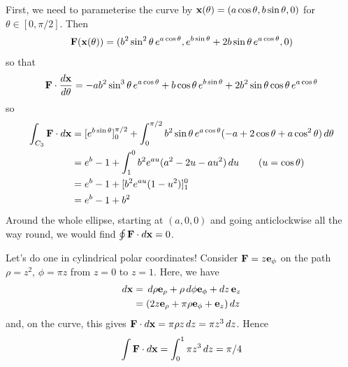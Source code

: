 \documentclass{../../template/note}
\begin{document}
\begin{example*}
\begin{itemize}
            First, we need to parameterise the curve by \(\V x(\theta) = (a \cos \theta, b \sin \theta, 0)\) for \(\theta \in [0, \pi/2]\). Then
            \begin{align*}
                \V F(\V x(\theta)) = (b^2 \sin^2 \theta \, e^{a \cos \theta}, e^{b \sin \theta} + 2b \sin \theta \, e^{a \cos \theta}, 0)
            \end{align*}
            so that
            \begin{align*}
                \V F \cdot \frac{d \V x}{d \theta} = -ab^2 \sin^3 \theta \, e^{a \cos \theta} + b \cos \theta \, e^{b \sin \theta}+ 2b^2 \sin \theta \cos \theta \, e^{a \cos \theta}
            \end{align*}
            so
            \begin{align*}
                \int_{C_3} \V F \cdot d \V x &= [e^{b \sin \theta}]^{\pi/2}_0 + \int_0^{\pi/2} b^2 \sin \theta \, e^{a \cos \theta} (-a + 2 \cos \theta + a \cos^2 \theta) \D \theta \\
                &= e^b - 1 + \int_1^0 b^2 e^{au} (a^2-2u-au^2) \D u \qquad (u = \cos \theta) \\
                &= e^b - 1 + [b^2e^{au}(1-u^2)]^0_1 \\
                &= e^b - 1 + b^2
            \end{align*}
            Around the whole ellipse, starting at \((a, 0, 0)\) and going anticlockwise all the way round, we would find \(\oint \V F \cdot d \V x = 0\).
        \end{itemize}
    \end{example*}
    
    \begin{example*}
        Let's do one in cylindrical polar coordinates! Consider \(\V F = z \V e_\phi\) on the path \(\rho = z^2\), \(\phi = \pi z\) from \(z = 0\) to \(z=1\). Here, we have
        \begin{align*}
            d \V x &= \D \rho \V e_\rho + \rho \D \phi \V e_\phi + dz\, \V e_z \\
            &= (2z \V e_\rho + \pi \rho \V e_\phi + \V e_z) \D z
        \end{align*}
        and, on the curve, this gives \(\V F \cdot d \V x = \pi \rho z \D z = \pi z^3 \D z\). Hence
        \begin{align*}
            \int \V F \cdot d \V x = \int_0^1 \pi z^3 \D z = \pi/4
        \end{align*}
    \end{example*}
    
\end{document}
